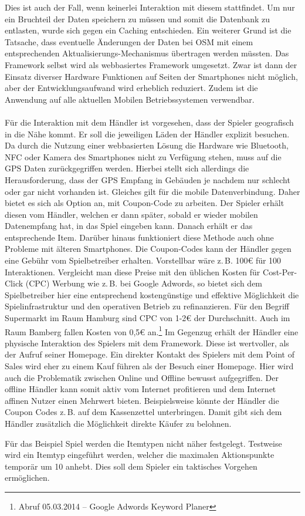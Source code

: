 Dies ist auch der Fall, wenn keinerlei Interaktion mit diesem stattfindet. Um nur ein Bruchteil der Daten speichern zu müssen und somit die Datenbank zu entlasten, wurde sich gegen ein Caching entschieden. Ein weiterer Grund ist die Tatsache, dass eventuelle Änderungen der Daten bei OSM mit einem entsprechenden Aktualisierungs-Mechanismus übertragen werden müssten.
Das Framework selbst wird als webbasiertes Framework umgesetzt.
Zwar ist dann der Einsatz diverser Hardware Funktionen auf Seiten der Smartphones nicht möglich, aber der Entwicklungsaufwand wird erheblich reduziert. Zudem ist die Anwendung auf alle aktuellen Mobilen Betriebssystemen verwendbar.
\\\\
Für die Interaktion mit dem Händler ist vorgesehen, dass der Spieler geografisch in die Nähe kommt. Er soll die jeweiligen Läden der Händler explizit besuchen. Da durch die Nutzung einer webbasierten Lösung die Hardware wie Bluetooth, NFC oder Kamera des Smartphones nicht zu Verfügung stehen, muss auf die GPS Daten zurückgegriffen werden.
Hierbei stellt sich allerdings die Herausforderung, dass der GPS Empfang in Gebäuden je nachdem nur schlecht oder gar nicht vorhanden ist. Gleiches gilt für die mobile Datenverbindung. Daher bietet es sich als Option an, mit Coupon-Code zu arbeiten. Der Spieler erhält diesen vom Händler, welchen er dann später, sobald er wieder mobilen Datenempfang hat, in das Spiel eingeben kann. Danach erhält er das entsprechende Item. Darüber hinaus funktioniert diese Methode auch ohne Probleme mit älteren Smartphones. Die Coupon-Codes kann der Händler gegen eine Gebühr vom Spielbetreiber erhalten. Vorstellbar wäre z.\,B. 100€ für 100 Interaktionen. Vergleicht man diese Preise mit den üblichen Kosten für Cost-Per-Click (CPC) Werbung wie z.\,B. bei Google Adwords, so bietet sich dem Spielbetreiber hier eine entsprechend kostengünstige und effektive Möglichkeit die Spielinfrastruktur und den operativen Betrieb zu refinanzieren.\cite{Guerini.2010} Für den Begriff Supermarkt im Raum Hamburg sind CPC von 1-2€ der Durchschnitt. Auch im Raum Bamberg fallen Kosten von 0,5€ an.\footnote{Abruf 05.03.2014 -- Google Adwords Keyword Planer} Im Gegenzug erhält der Händler eine physische Interaktion des Spielers mit dem Framework. Diese ist wertvoller, als der Aufruf seiner Homepage. Ein direkter Kontakt des Spielers mit dem Point of Sales wird eher zu einem Kauf führen als der Besuch einer Homepage. Hier wird auch die Problematik zwischen Online und Offline bewusst aufgegriffen. Der offline Händler kann somit aktiv vom Internet profitieren und dem Internet affinen Nutzer einen Mehrwert bieten. Beispielsweise könnte  der Händler die Coupon Codes z.\,B. auf dem Kassenzettel unterbringen. Damit gibt sich dem Händler zusätzlich die Möglichkeit direkte Käufer zu belohnen.

Für das Beispiel Spiel werden die Itemtypen nicht näher festgelegt. Testweise wird ein Itemtyp eingeführt werden, welcher die maximalen Aktionspunkte temporär um 10 anhebt. Dies soll dem Spieler ein taktisches Vorgehen ermöglichen.

